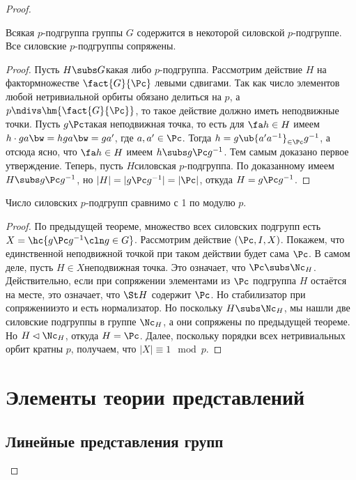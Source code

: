 \documentclass[a4paper]{article}
\begin{document}
\begin{proof}
\begin{theorem}
Всякая $p$-подгруппа группы $G$ содержится в некоторой силовской $p$-подгруппе.  Все силовские $p$-подгруппы
сопряжены.
\end{theorem}
\begin{proof}
Пусть $H \subs G$\т какая либо $p$-подгруппа. Рассмотрим действие $H$ на  фактормножестве $\fact{G}{\Pc}$
левыми сдвигами. Так как число элементов любой нетривиальной орбиты обязано делиться на $p$, а $p \ndivs
\hm{\fact{G}{\Pc}}$, то такое действие должно иметь неподвижные точки. Пусть $g\Pc$\т такая неподвижная
точка, то есть для $\fa h \in H$ имеем $h \cdot ga \bw= hga \bw= ga'$, где $a, a' \in \Pc$. Тогда $h = g\ub{a'a^{-1}}_{\in
\Pc}g^{-1}$, а отсюда ясно, что $\fa h \in H$ имеем $h \subs g\Pc g^{-1}$. Тем самым доказано первое
утверждение. Теперь, пусть $H$\т силовская $p$-подгруппа. По доказанному имеем $H \subs g\Pc g^{-1}$, но
$|H|=|g\Pc g^{-1}|=|\Pc|$, откуда $H = g\Pc g^{-1}$.
\end{proof}

\begin{theorem}
Число силовских $p$-подгрупп сравнимо с 1 по модулю $p$.
\end{theorem}
\begin{proof}
По предыдущей теореме, множество всех силовских подгрупп есть  $X = \hc{g\Pc g^{-1}\cln g \in G}$. Рассмотрим
действие $(\Pc, I, X)$. Покажем, что единственной неподвижной точкой при таком действии будет сама $\Pc$. В
самом деле, пусть $H \in X$\т неподвижная точка. Это означает, что $\Pc \subs \Nc_H$. Действительно, если при
сопряжении элементами из $\Pc$ подгруппа $H$ остаётся на месте, это означает, что $\St H$ содержит $\Pc$. Но
стабилизатор при сопряжении\т это и есть нормализатор. Но поскольку $H \subs \Nc_H$, мы нашли две силовские
подгруппы в группе $\Nc_H$, а они сопряжены по предыдущей теореме. Но $H \lhd \Nc_H$, откуда $H = \Pc$.
Далее, поскольку порядки всех нетривиальных орбит кратны $p$, получаем, что $|X| \equiv 1 \mod p$.
\end{proof}

\section{Элементы теории представлений}

\subsection{Линейные представления групп}


\end{proof}
\end{document}

